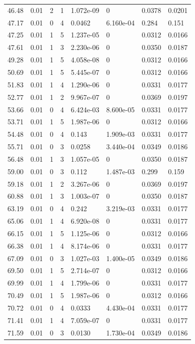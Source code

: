 \documentclass[preview]{standalone}
\begin{document}
{{{\begin{tabular}{L{1.2cm}C{1.2cm} C{0.3cm}C{0.5cm} C{1.4cm}C{1.4cm} C{1.4cm}C{1.4cm}}
  46.48  &  0.01  & 2     &  1 &  1.072e-09  & 0  & 0.0378 &  0.0201   \\ 
  47.17  &  0.01  & 0     &  4 &  0.0462  & 6.160e-04  & 0.284 &  0.151   \\ 
  47.25  &  0.01  & 1     &  5 &  1.237e-05  & 0  & 0.0312 &  0.0166   \\ 
  47.61  &  0.01  & 1     &  3 &  2.230e-06  & 0  & 0.0350 &  0.0187   \\ 
  49.28  &  0.01  & 1     &  5 &  4.058e-08  & 0  & 0.0312 &  0.0166   \\ 
  50.69  &  0.01  & 1     &  5 &  5.445e-07  & 0  & 0.0312 &  0.0166   \\ 
  51.83  &  0.01  & 1     &  4 &  1.290e-06  & 0  & 0.0331 &  0.0177   \\ 
  52.77  &  0.01  & 1     &  2 &  9.967e-07  & 0  & 0.0369 &  0.0197   \\ 
  53.66  &  0.01  & 0     &  4 &  6.424e-03  & 8.600e-05  & 0.0331 &  0.0177   \\ 
  53.71  &  0.01  & 1     &  5 &  1.987e-06  & 0  & 0.0312 &  0.0166   \\ 
  54.48  &  0.01  & 0     &  4 &  0.143  & 1.909e-03  & 0.0331 &  0.0177   \\ 
  55.71  &  0.01  & 0     &  3 &  0.0258  & 3.440e-04  & 0.0349 &  0.0186   \\ 
  56.48  &  0.01  & 1     &  3 &  1.057e-05  & 0  & 0.0350 &  0.0187   \\ 
  59.00  &  0.01  & 0     &  3 &  0.112  & 1.487e-03  & 0.299 &  0.159   \\ 
  59.18  &  0.01  & 1     &  2 &  3.267e-06  & 0  & 0.0369 &  0.0197   \\ 
  60.88  &  0.01  & 1     &  3 &  1.003e-07  & 0  & 0.0350 &  0.0187   \\ 
  63.19  &  0.01  & 0     &  4 &  0.242  & 3.219e-03  & 0.0331 &  0.0177   \\ 
  65.06  &  0.01  & 1     &  4 &  6.920e-08  & 0  & 0.0331 &  0.0177   \\ 
  66.15  &  0.01  & 1     &  5 &  1.125e-06  & 0  & 0.0312 &  0.0166   \\ 
  66.38  &  0.01  & 1     &  4 &  8.174e-06  & 0  & 0.0331 &  0.0177   \\ 
  67.09  &  0.01  & 0     &  3 &  1.027e-03  & 1.400e-05  & 0.0349 &  0.0186   \\ 
  69.50  &  0.01  & 1     &  5 &  2.714e-07  & 0  & 0.0312 &  0.0166   \\ 
  69.99  &  0.01  & 1     &  4 &  1.799e-06  & 0  & 0.0331 &  0.0177   \\ 
  70.49  &  0.01  & 1     &  5 &  1.987e-06  & 0  & 0.0312 &  0.0166   \\ 
  70.72  &  0.01  & 0     &  4 &  0.0333  & 4.430e-04  & 0.0331 &  0.0177   \\ 
  71.41  &  0.01  & 1     &  4 &  7.059e-07  & 0  & 0.0331 &  0.0177   \\ 
  71.59  &  0.01  & 0     &  3 &  0.0130  & 1.730e-04  & 0.0349 &  0.0186   \\ 
\hline 
\end{tabular} 

}}}
\end{document}
